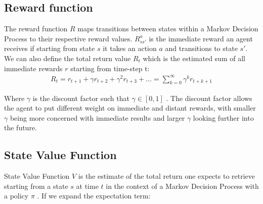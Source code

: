 \subsection{Reward function}
The reward function $R$ maps transitions between states within a
Markov Decision Process to their respective reward values.
$R_{ss'}^{a}$ is the immediate reward an agent receives if starting from state $s$ it takes an action $a$ and transitions to state $s'$.\\

We can also define the total return value $R_t$ which is the estimated sum of all immediate rewards $r$ starting from time-step t:
\begin{align}
    R_t = r_{t+1} + \gamma r_{t+2} + \gamma ^2 r_{t+3} + ... = \sum^{\infty}_{k=0}\gamma^{k}r_{t+k+1} \label{eq:return}
\end{align}

Where $\gamma$ is the discount factor such that $\gamma \in [0, 1]$ \cite{lecture_lets_go_markov}. The discount factor allows the agent to put different weight on immediate and distant rewards, with smaller $\gamma$ being more concerned with immediate results and larger $\gamma$ looking further into the future. 



\subsection{State Value Function}
State Value Function $V$ is the estimate of the total return one expects to retrieve starting from a state $s$ at time $t$ in the context of a Markov Decision Process with a policy $\pi$ \cite{lecture_lets_go_markov}. If we expand the expectation term:
%      

